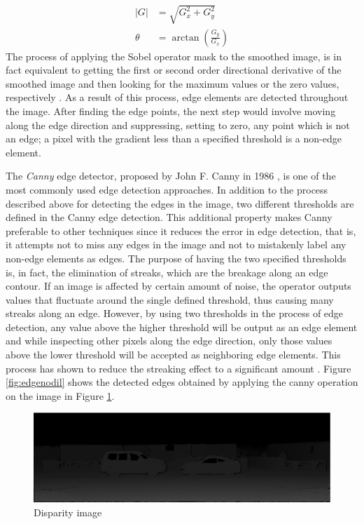 \begin{align}
\left | G \right | &= \sqrt{G_{x}^{2} + G_{y}^{2}} \\
\theta &= \arctan (\frac{G_{y}}{G_{x}})
\end{align} \newline
The process of applying the Sobel operator mask to the smoothed image, is in fact equivalent to getting 
the first or second order directional derivative of the smoothed image and then looking for the maximum values or the zero values, 
respectively \cite{sze11}. 
As a result of this process, edge elements are detected throughout the image.
After finding the edge points, the next step would involve moving along the edge direction and suppressing, setting to zero, any point which is not an edge;
a pixel with the gradient less than a specified threshold is a non-edge element.

The {\it Canny} edge detector, proposed by John F. Canny in 1986 \cite{canny86}, is one of the most commonly used edge detection approaches. In addition 
to the process described above for detecting the edges in the image, two different thresholds are defined in the Canny edge detection. This
additional property makes Canny preferable to other techniques since it reduces the error in edge detection, that is, it attempts
not to miss any edges in the image and not to mistakenly label any non-edge elements as edges.
The purpose of having the two specified thresholds is, in fact, the elimination of streaks, which are the breakage along an edge contour.
If an image is affected by certain amount of noise, the operator outputs values that fluctuate around the single defined threshold, thus
causing many streaks along an edge.
However, by using two thresholds in the process of edge detection, 
any value above the higher threshold will be output as an edge element and while inspecting other pixels along 
the edge direction, only those values above the lower threshold will be accepted as neighboring edge elements.
This process has shown to reduce the streaking effect to a significant amount \cite{canny86}. \newline
Figure \ref{fig:edgenodil} shows the detected edges obtained by applying the canny operation on the image in Figure \ref{fig:imggt5}.

\begin{figure}[H]
\centering
\includegraphics[scale=0.35]{imggt5}
\caption{Disparity image}
\label{fig:imggt5}
\end{figure} 

